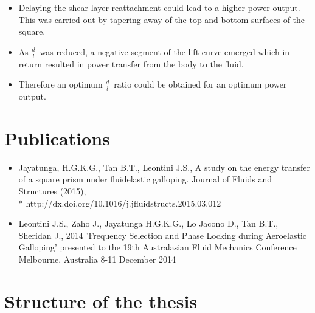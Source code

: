 \documentclass[authoryear,12pt]{article}
\newcommand{\ratio}{\ensuremath{\frac{d}{l}}}
\begin{document}
\begin{itemize}
\item Delaying the shear layer reattachment could lead to a higher power output. This was carried out by tapering away of the top and bottom surfaces of the square. 

\item As \ratio \ was reduced, a negative segment of the lift curve emerged which in return resulted in power transfer from the body to the fluid.
 

\item Therefore an optimum \ratio \ ratio could be obtained for an optimum power output.   


\end{itemize}
\clearpage

\section{Publications}

\begin{itemize}
	\item Jayatunga, H.G.K.G., Tan B.T., Leontini J.S., A study on the energy transfer of a square prism under fluidelastic galloping. Journal of Fluids and Structures (2015), 
	\\*  http://dx.doi.org/10.1016/j.jfluidstructs.2015.03.012
	
	\item  Leontini J.S., Zaho J., Jayatunga H.G.K.G., Lo Jacono D., Tan B.T., Sheridan J., 2014 'Frequency Selection and Phase Locking during Aeroelastic Galloping' presented to the 19th Australasian Fluid Mechanics Conference
	Melbourne, Australia 8-11 December 2014
	
	
		

\end{itemize}


\clearpage

\section{Structure of the thesis}
\end{document}
